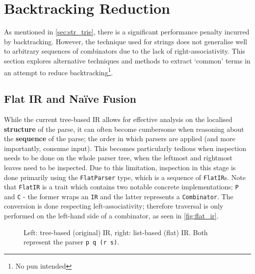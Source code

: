 \section{Backtracking Reduction}
\label{sec:backtrack_reduction}

As mentioned in \autoref{sec:str_trie}, there is a significant performance penalty incurred by backtracking.
However, the technique used for strings does not generalise well to arbitrary sequences of combinators due to the lack of right-associativity.
This section explores alternative techniques and methods to extract `common' terms in an attempt to reduce backtracking\footnote{No pun intended}.

\subsection{Flat IR and Na\"ive Fusion}
\label{ssec:flat_ir}
While the current tree-based IR allows for effective analysis on the localised \textbf{structure} of the parse, it can often become cumbersome when reasoning about the \textbf{sequence} of the parse; the order in which parsers are applied (and more importantly, consume input).
This becomes particularly tedious when inspection needs to be done on the whole parser tree, when the leftmost and rightmost leaves need to be inspected.
Due to this limitation, inspection in this stage is done primarily using the \texttt{FlatParser} type, which is a sequence of \texttt{FlatIR}s.
Note that \texttt{FlatIR} is a trait which contains two notable concrete implementations; \texttt{P} and \texttt{C} - the former wraps an \texttt{IR} and the latter represents a \texttt{Combinator}.
The conversion is done respecting left-associativity; therefore traversal is only performed on the left-hand side of a combinator, as seen in \autoref{fig:flat_ir}.

\begin{figure}[H]
    \centering
    \caption{
        Left: tree-based (original) IR, right: list-based (flat) IR.
        Both represent the parser \texttt{p \ap q \ap (r \mult s)}.
    }
    \label{fig:flat_ir}
\end{figure}

